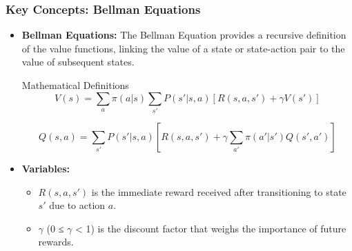 \documentclass{beamer}
\begin{document}
\begin{frame}[fragile]
    \frametitle{Key Concepts: Bellman Equations}
    
    \begin{itemize}
        \item \textbf{Bellman Equations:}
        The Bellman Equation provides a recursive definition of the value functions, 
        linking the value of a state or state-action pair to the value of subsequent states.
        
        \begin{block}{Mathematical Definitions}
            \begin{equation}
                V(s) = \sum_{a} \pi(a|s) \sum_{s'} P(s'|s, a) 
                [R(s, a, s') + \gamma V(s')]
            \end{equation}
            
            \begin{equation}
                Q(s, a) = \sum_{s'} P(s'|s, a) 
                [R(s, a, s') + \gamma \sum_{a'} \pi(a'|s') Q(s', a')]
            \end{equation}
        \end{block}
        
        \item \textbf{Variables:}
        \begin{itemize}
            \item \(R(s, a, s')\) is the immediate reward received 
            after transitioning to state \(s'\) due to action \(a\).
            \item \(\gamma\) (0 ≤ \(\gamma\) < 1) is the discount factor 
            that weighs the importance of future rewards.
        \end{itemize}
    \end{itemize}
\end{frame}
\end{document}
